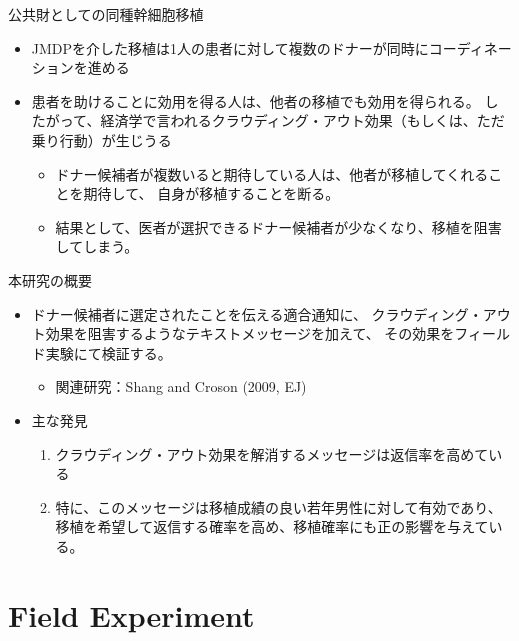 \documentclass[
      aspectratio=169,
        12pt,
    ]{beamer}
\providecommand{\tightlist}{%
  \setlength{\itemsep}{0pt}\setlength{\parskip}{0pt}}
\begin{document}
\begin{frame}{公共財としての同種幹細胞移植}
\protect\hypertarget{ux516cux5171ux8ca1ux3068ux3057ux3066ux306eux540cux7a2eux5e79ux7d30ux80deux79fbux690d}{}
\begin{itemize}
\tightlist
\item
  JMDPを介した移植は1人の患者に対して複数のドナーが同時にコーディネーションを進める
\item
  患者を助けることに効用を得る人は、他者の移植でも効用を得られる。
  したがって、経済学で言われるクラウディング・アウト効果（もしくは、ただ乗り行動）が生じうる

  \begin{itemize}
  \tightlist
  \item
    ドナー候補者が複数いると期待している人は、他者が移植してくれることを期待して、
    自身が移植することを断る。
  \item
    結果として、医者が選択できるドナー候補者が少なくなり、移植を阻害してしまう。
  \end{itemize}
\end{itemize}
\end{frame}

\begin{frame}{本研究の概要}
\protect\hypertarget{ux672cux7814ux7a76ux306eux6982ux8981}{}
\begin{itemize}
\tightlist
\item
  ドナー候補者に選定されたことを伝える適合通知に、
  クラウディング・アウト効果を阻害するようなテキストメッセージを加えて、
  その効果をフィールド実験にて検証する。

  \begin{itemize}
  \tightlist
  \item
    関連研究：Shang and Croson (2009, EJ)
  \end{itemize}
\item
  主な発見

  \begin{enumerate}
  \tightlist
  \item
    クラウディング・アウト効果を解消するメッセージは返信率を高めている
  \item
    特に、このメッセージは移植成績の良い若年男性に対して有効であり、
    移植を希望して返信する確率を高め、移植確率にも正の影響を与えている。
  \end{enumerate}
\end{itemize}
\end{frame}

\hypertarget{field-experiment}{%
\section{Field Experiment}\label{field-experiment}}
\end{document}
